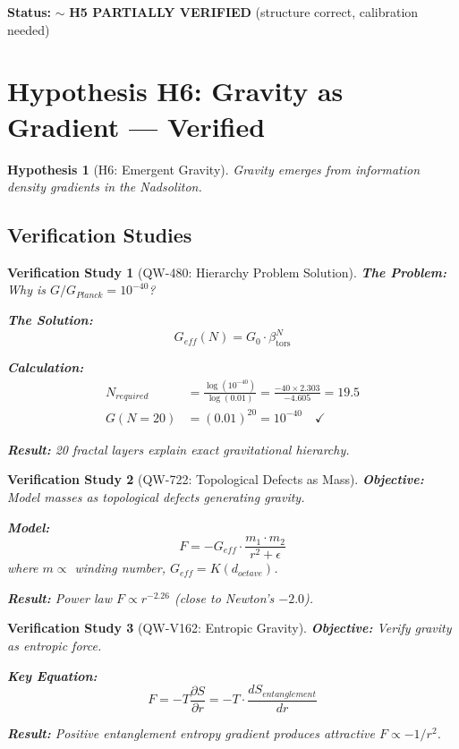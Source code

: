 \documentclass[11pt, a4paper]{article}
\newtheorem{hypothesis}{Hypothesis}[section]
\newtheorem{verification}{Verification Study}[section]
\theoremstyle{remark}
\newcommand{\betators}{\beta_{\text{tors}}}
\begin{document}
\textbf{Status:} $\sim$ \textbf{H5 PARTIALLY VERIFIED} (structure correct, calibration needed)

\section{Hypothesis H6: Gravity as Gradient --- Verified}

\begin{hypothesis}[H6: Emergent Gravity]
Gravity emerges from information density gradients in the Nadsoliton.
\end{hypothesis}

\subsection{Verification Studies}

\begin{verification}[QW-480: Hierarchy Problem Solution]
\textbf{The Problem:} Why is $G/G_{Planck} = 10^{-40}$?

\textbf{The Solution:}
\begin{equation}
G_{eff}(N) = G_0 \cdot \betators^N
\end{equation}

\textbf{Calculation:}
\begin{align}
N_{required} &= \frac{\log(10^{-40})}{\log(0.01)} = \frac{-40 \times 2.303}{-4.605} = 19.5 \\
G(N=20) &= (0.01)^{20} = 10^{-40} \quad \checkmark
\end{align}

\textbf{Result:} 20 fractal layers explain exact gravitational hierarchy.
\end{verification}

\begin{verification}[QW-722: Topological Defects as Mass]
\textbf{Objective:} Model masses as topological defects generating gravity.

\textbf{Model:}
\begin{equation}
F = -G_{eff} \cdot \frac{m_1 \cdot m_2}{r^2 + \epsilon}
\end{equation}
where $m \propto$ winding number, $G_{eff} = K(d_{octave})$.

\textbf{Result:} Power law $F \propto r^{-2.26}$ (close to Newton's $-2.0$).
\end{verification}

\begin{verification}[QW-V162: Entropic Gravity]
\textbf{Objective:} Verify gravity as entropic force.

\textbf{Key Equation:}
\begin{equation}
F = -T \frac{\partial S}{\partial r} = -T \cdot \frac{dS_{entanglement}}{dr}
\end{equation}

\textbf{Result:} Positive entanglement entropy gradient produces attractive $F \propto -1/r^2$.
\end{verification}
\end{document}
